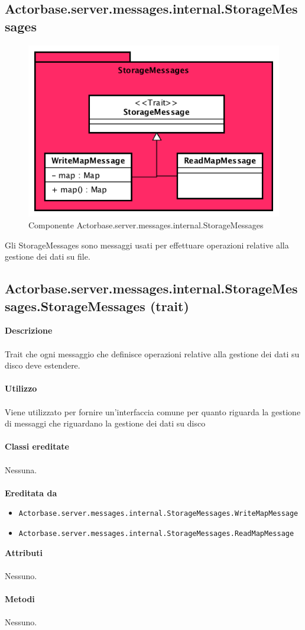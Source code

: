 \documentclass[a4paper]{article}
\begin{document}
	\subsection{Actorbase.server.messages.internal.StorageMessages}
						\begin{figure}[H]
			\centering
			\includegraphics[scale = 0.8]{Server/StorageMessages.png}
			\caption{Componente Actorbase.server.messages.internal.StorageMessages}
		\end{figure}
		Gli StorageMessages sono messaggi usati per effettuare operazioni relative alla gestione dei dati su file.
		
	\subsection{Actorbase.server.messages.internal.StorageMessages.StorageMessages (trait)}
		\textbf{Descrizione}
			\\ \\
			Trait che ogni messaggio che definisce operazioni relative alla gestione dei dati su disco deve estendere.
			\\ \\
		\textbf{Utilizzo}
			\\ \\
			Viene utilizzato per fornire un'interfaccia comune per quanto riguarda la gestione di messaggi che riguardano la gestione dei dati su disco
			\\ \\
		\textbf{Classi ereditate}
			\\ \\
			Nessuna.
			\\ \\
		\textbf{Ereditata da}
			\begin{itemize}
				\item \texttt{Actorbase.server.messages.internal.StorageMessages.WriteMapMessage}
				\item \texttt{Actorbase.server.messages.internal.StorageMessages.ReadMapMessage}
			\end{itemize}
		\textbf{Attributi}
			\\ \\
			Nessuno.
			\\ \\
		\textbf{Metodi}
			\\ \\
			Nessuno.
			
\end{document}
